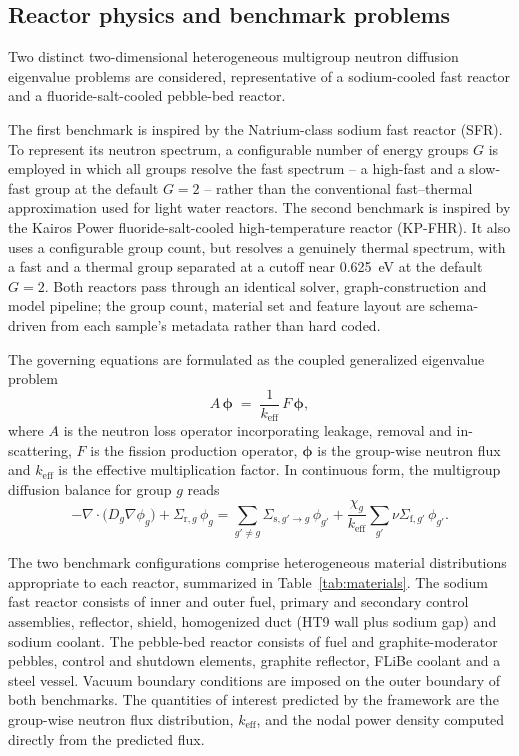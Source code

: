 \documentclass[preprint,12pt]{elsarticle}
\newcommand{\keff}{k_{\mathrm{eff}}}
\newcommand{\Sig}[1]{\Sigma_{\mathrm{#1}}}
\begin{document}
\subsection{Reactor physics and benchmark problems}
\label{sec:benchmarks}

Two distinct two-dimensional heterogeneous multigroup neutron diffusion
eigenvalue problems are considered, representative of a sodium-cooled fast
reactor and a fluoride-salt-cooled pebble-bed reactor.

The first benchmark is inspired by the Natrium-class sodium fast reactor
(SFR). To represent its neutron spectrum, a configurable number of energy
groups $G$ is employed in which all groups resolve the fast spectrum -- a
high-fast and a slow-fast group at the default $G=2$ -- rather than the
conventional fast--thermal approximation used for light water reactors. The
second benchmark is inspired by the Kairos Power fluoride-salt-cooled
high-temperature reactor (KP-FHR). It also uses a configurable group count,
but resolves a genuinely thermal spectrum, with a fast and a thermal group
separated at a cutoff near 0.625~eV at the default $G=2$. Both reactors pass
through an identical solver, graph-construction and model pipeline; the group
count, material set and feature layout are schema-driven from each sample's
metadata rather than hard coded.

The governing equations are formulated as the coupled generalized eigenvalue
problem
\begin{equation}
A\,\boldsymbol{\phi} \;=\; \frac{1}{\keff}\,F\,\boldsymbol{\phi},
\label{eq:eigen}
\end{equation}
where $A$ is the neutron loss operator incorporating leakage, removal and
in-scattering, $F$ is the fission production operator, $\boldsymbol{\phi}$ is
the group-wise neutron flux and $\keff$ is the effective multiplication factor.
In continuous form, the multigroup diffusion balance for group $g$ reads
\citep{duderstadt1976,stacey2007}
\begin{equation}
-\nabla\!\cdot\!\big(D_g \nabla \phi_g\big)
+ \Sig{r,\mathit{g}}\,\phi_g
= \sum_{g'\neq g} \Sigma_{\mathrm{s},g'\rightarrow g}\,\phi_{g'}
+ \frac{\chi_g}{\keff}\sum_{g'} \nu\Sigma_{\mathrm{f},g'}\,\phi_{g'} .
\label{eq:diffusion}
\end{equation}

The two benchmark configurations comprise heterogeneous material distributions
appropriate to each reactor, summarized in Table~\ref{tab:materials}. The
sodium fast reactor consists of inner and outer fuel, primary and secondary
control assemblies, reflector, shield, homogenized duct (HT9 wall plus sodium
gap) and sodium coolant. The pebble-bed reactor consists of fuel and
graphite-moderator pebbles, control and shutdown elements, graphite reflector,
FLiBe coolant and a steel vessel. Vacuum boundary conditions are imposed on the
outer boundary of both benchmarks. The quantities of interest predicted by the
framework are the group-wise neutron flux distribution, $\keff$, and the nodal
power density computed directly from the predicted flux.
\end{document}
